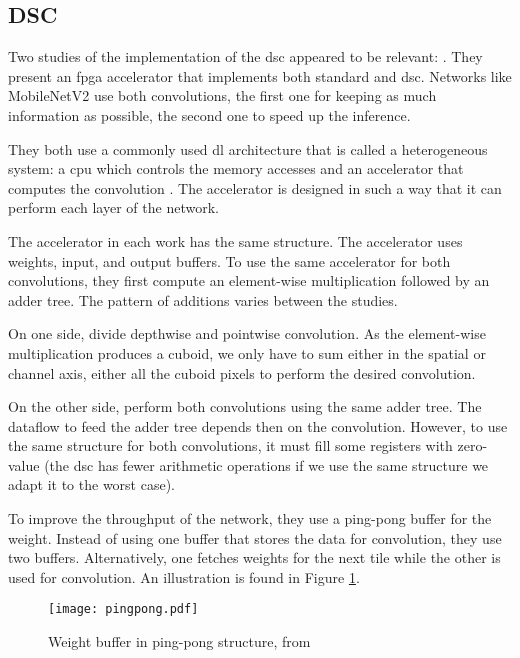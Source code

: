 \subsection{DSC} \label{subsec:impl_dsc}
%
%
Two studies of the implementation of the \acrshort{dsc} appeared to be relevant: \textcite{bai_cnn_2018, liu_fpga-based_2019}. They present an \acrshort{fpga} accelerator that implements both standard and \acrshort{dsc}. Networks like MobileNetV2 use both convolutions, the first one for keeping as much information as possible, the second one to speed up the inference. 

They both use a commonly used \acrshort{dl} architecture that is called a heterogeneous system: a \acrshort{cpu} which controls the memory accesses and an accelerator that computes the convolution \cite{liu_fpga-based_2019}. The accelerator is designed in such a way that it can perform each layer of the network.

The accelerator in each work has the same structure. The accelerator uses weights, input, and output buffers. To use the same accelerator for both convolutions, they first compute an element-wise multiplication followed by an adder tree. The pattern of additions varies between the studies. 

On one side, \textcite{bai_cnn_2018} divide depthwise and pointwise convolution. As the element-wise multiplication produces a cuboid, we only have to sum either in the spatial or channel axis, either all the cuboid pixels to perform the desired convolution. 

On the other side, \textcite{liu_fpga-based_2019} perform both convolutions using the same adder tree. The dataflow to feed the adder tree depends then on the convolution. However, to use the same structure for both convolutions, it must fill some registers with zero-value (the \acrshort{dsc} has fewer arithmetic operations if we use the same structure we adapt it to the worst case).

To improve the throughput of the network, they use a ping-pong buffer for the weight. Instead of using one buffer that stores the data for convolution, they use two buffers. Alternatively, one fetches weights for the next tile while the other is used for convolution. An illustration is found in Figure \ref{fig:ping_pong_buffer}.
%
\begin{figure}[H]
	\centering
	\texttt{[image: pingpong.pdf]}
	\caption{Weight buffer in ping-pong structure, from \cite{bai_cnn_2018}}
	\label{fig:ping_pong_buffer}
\end{figure}

